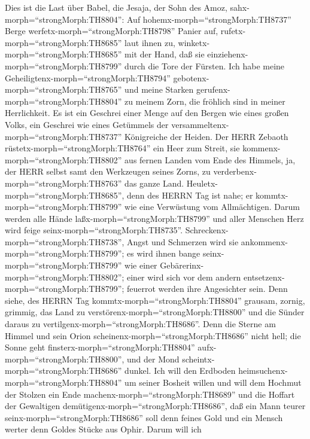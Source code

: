  Dies ist die Last über Babel, die Jesaja, der Sohn des
Amoz, sahx-morph=``strongMorph:TH8804'':  Auf
hohemx-morph=``strongMorph:TH8737'' Berge
werfetx-morph=``strongMorph:TH8798'' Panier auf,
rufetx-morph=``strongMorph:TH8685'' laut ihnen zu,
winketx-morph=``strongMorph:TH8685'' mit der Hand, daß sie
einziehenx-morph=``strongMorph:TH8799'' durch die Tore der Fürsten.
 Ich habe meine Geheiligtenx-morph=``strongMorph:TH8794''
gebotenx-morph=``strongMorph:TH8765'' und meine Starken
gerufenx-morph=``strongMorph:TH8804'' zu meinem Zorn, die fröhlich sind
in meiner Herrlichkeit.  Es ist ein Geschrei einer Menge auf
den Bergen wie eines großen Volks, ein Geschrei wie eines Getümmels der
versammeltenx-morph=``strongMorph:TH8737'' Königreiche der Heiden. Der
HERR Zebaoth rüstetx-morph=``strongMorph:TH8764'' ein Heer zum Streit,
 sie kommenx-morph=``strongMorph:TH8802'' aus fernen Landen
vom Ende des Himmels, ja, der HERR selbst samt den Werkzeugen seines
Zorns, zu verderbenx-morph=``strongMorph:TH8763'' das ganze Land.
 Heuletx-morph=``strongMorph:TH8685'', denn des HERRN Tag
ist nahe; er kommtx-morph=``strongMorph:TH8799'' wie eine Verwüstung vom
Allmächtigen.  Darum werden alle Hände
laßx-morph=``strongMorph:TH8799'' und aller Menschen Herz wird feige
seinx-morph=``strongMorph:TH8735''. 
Schreckenx-morph=``strongMorph:TH8738'', Angst und Schmerzen wird sie
ankommenx-morph=``strongMorph:TH8799''; es wird ihnen bange
seinx-morph=``strongMorph:TH8799'' wie einer
Gebärerinx-morph=``strongMorph:TH8802''; einer wird sich vor dem andern
entsetzenx-morph=``strongMorph:TH8799''; feuerrot werden ihre
Angesichter sein.  Denn siehe, des HERRN Tag
kommtx-morph=``strongMorph:TH8804'' grausam, zornig, grimmig, das Land
zu verstörenx-morph=``strongMorph:TH8800'' und die Sünder daraus zu
vertilgenx-morph=``strongMorph:TH8686''.  Denn die Sterne
am Himmel und sein Orion scheinenx-morph=``strongMorph:TH8686'' nicht
hell; die Sonne geht finsterx-morph=``strongMorph:TH8804''
aufx-morph=``strongMorph:TH8800'', und der Mond
scheintx-morph=``strongMorph:TH8686'' dunkel.  Ich will den
Erdboden heimsuchenx-morph=``strongMorph:TH8804'' um seiner Bosheit
willen und will dem Hochmut der Stolzen ein Ende
machenx-morph=``strongMorph:TH8689'' und die Hoffart der Gewaltigen
demütigenx-morph=``strongMorph:TH8686'',  daß ein Mann
teurer seinx-morph=``strongMorph:TH8686'' soll denn feines Gold und ein
Mensch werter denn Goldes Stücke aus Ophir.  Darum will ich
